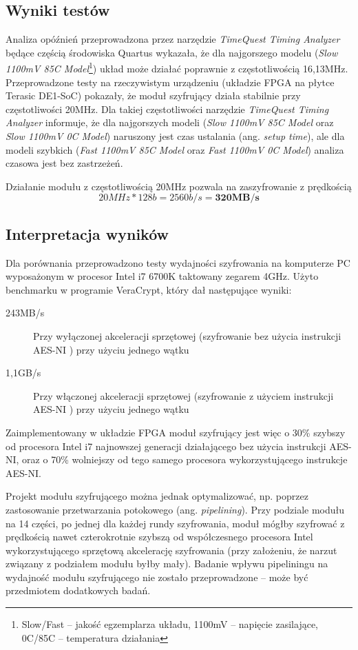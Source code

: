 \subsection{Wyniki testów}
Analiza opóźnień przeprowadzona przez narzędzie \textit{TimeQuest Timing Analyzer} będące częścią środowiska Quartus wykazała, że dla najgorszego modelu (\textit{Slow 1100mV 85C Model}\footnote{Slow/Fast -- jakość egzemplarza układu, 1100mV -- napięcie zasilające, 0C/85C -- temperatura działania}) układ może działać poprawnie z częstotliwością 16,13MHz. Przeprowadzone testy na rzeczywistym urządzeniu (układzie FPGA na płytce Terasic DE1-SoC) pokazały, że moduł szyfrujący działa stabilnie przy częstotliwości 20MHz. Dla takiej częstotliwości narzędzie \textit{TimeQuest Timing Analyzer} informuje, że dla najgorszych modeli (\textit{Slow 1100mV 85C Model} oraz \textit{Slow 1100mV 0C Model}) naruszony jest czas ustalania (ang. \textit{setup time}), ale dla modeli szybkich (\textit{Fast 1100mV 85C Model} oraz \textit{Fast 1100mV 0C Model}) analiza czasowa jest bez zastrzeżeń.

Działanie modułu z częstotliwością 20MHz pozwala na zaszyfrowanie z prędkością
\begin{equation*}
20MHz * 128b = 2560b/s = \textbf{320MB/s}
\end{equation*}

\subsection{Interpretacja wyników}
Dla porównania przeprowadzono testy wydajności szyfrowania na komputerze PC wyposażonym w procesor Intel i7 6700K taktowany zegarem 4GHz. Użyto benchmarku w programie VeraCrypt, który dał następujące wyniki:
\begin{description}
\item[243MB/s] Przy wyłączonej akceleracji sprzętowej (szyfrowanie bez użycia instrukcji AES-NI \cite{aes-processors}) przy użyciu jednego wątku
\item[1,1GB/s] Przy włączonej akceleracji sprzętowej (szyfrowanie z użyciem instrukcji AES-NI \cite{aes-processors}) przy użyciu jednego wątku
\end{description}

Zaimplementowany w układzie FPGA moduł szyfrujący jest więc o 30\% szybszy od procesora Intel i7 najnowszej generacji działającego bez użycia instrukcji AES-NI, oraz o 70\% wolniejszy od tego samego procesora wykorzystującego instrukcje AES-NI.

Projekt modułu szyfrującego można jednak optymalizować, np. poprzez zastosowanie przetwarzania potokowego (ang. \textit{pipelining}). Przy podziale modułu na 14  części, po jednej dla każdej rundy szyfrowania, moduł mógłby szyfrować z prędkością nawet czterokrotnie szybszą od współczesnego procesora Intel wykorzystującego sprzętową akcelerację szyfrowania (przy założeniu, że narzut związany z podziałem modułu byłby mały). Badanie wpływu pipeliningu na wydajność modułu szyfrującego nie zostało przeprowadzone -- może być przedmiotem dodatkowych badań.